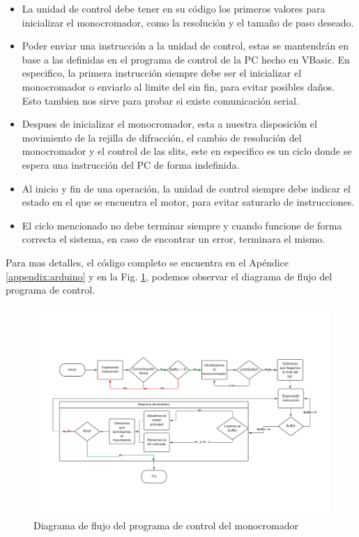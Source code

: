\begin{itemize}
    \item La unidad de control debe tener en su código los primeros valores para inicializar el monocromador, como la resolución y el tamaño de paso deseado.
    \item Poder enviar una instrucción a la unidad de control, estas se mantendrán en base a las definidas en el programa de control de la PC hecho en VBasic. En especifico, la primera instrucción siempre debe ser el inicializar el monocromador o enviarlo al limite del sin fin, para evitar posibles daños. Esto tambien nos sirve para probar si existe comunicación serial.
    \item Despues de inicializar el monocromador, esta a nuestra disposición el movimiento de la rejilla de difracción, el cambio de resolución del monocromador y el control de las slits, este en especifico es un ciclo donde se espera una instrucción del PC de forma indefinida.
    \item Al inicio y fin de una operación, la unidad de control siempre debe indicar el estado en el que se encuentra el motor, para evitar saturarlo de instrucciones.
    \item El ciclo mencionado no debe terminar siempre y cuando funcione de forma correcta el sistema, en caso de encontrar un error, terminara el mismo.
\end{itemize}

Para mas detalles, el código completo se encuentra en el Apéndice \ref{appendix:arduino} y en la Fig. \ref{fig:mono_flow}, podemos observar el diagrama de flujo del programa de control.

\begin{figure}[H]
    \centering
    \includegraphics[width=1\textwidth]{figures/chap2/monocromador.pdf}
        \caption{Diagrama de flujo del programa de control del monocromador}
    \label{fig:mono_flow}
\end{figure}

